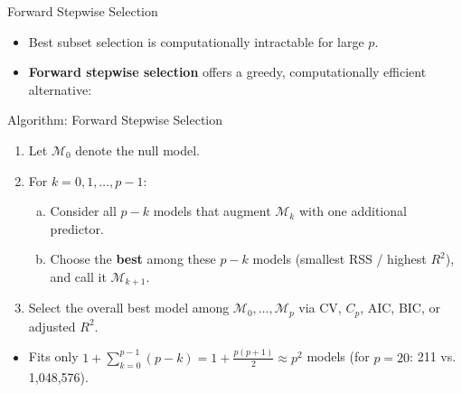 \documentclass[aspectratio=169, 11pt]{beamer}
\begin{document}
\begin{frame}{Forward Stepwise Selection}
    \begin{itemize}
        \item Best subset selection is computationally intractable for large $p$.
        \item \textbf{Forward stepwise selection} offers a greedy, computationally efficient alternative:
    \end{itemize}
    \begin{block}{Algorithm: Forward Stepwise Selection}
    \begin{enumerate}
        \item Let $\mathcal{M}_0$ denote the null model.
        \item For $k = 0, 1, \dots, p-1$:
        \begin{enumerate}[(a)]
            \item Consider all $p - k$ models that augment $\mathcal{M}_k$ with one additional predictor.
            \item Choose the \textbf{best} among these $p - k$ models (smallest RSS / highest $R^2$), and call it $\mathcal{M}_{k+1}$.
        \end{enumerate}
        \item Select the overall best model among $\mathcal{M}_0, \dots, \mathcal{M}_p$ via CV, $C_p$, AIC, BIC, or adjusted $R^2$.
    \end{enumerate}
    \end{block}
    \begin{itemize}
        \item Fits only $1 + \sum_{k=0}^{p-1}(p-k) = 1 + \frac{p(p+1)}{2} \approx p^2$ models (for $p=20$: 211 vs. 1,048,576).
    \end{itemize}
\end{frame}
\end{document}
